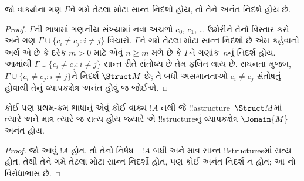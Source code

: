\documentclass[../../../include/open-logic-section]{subfiles}
\begin{document}

\begin{thm}
 જો વાક્યોના ગણ $\Gamma$ને ગમે તેટલા મોટા સાન્ત
નિદર્શો હોય, તો તેને અનંત નિદર્શ હોય છે.
\end{thm}

\begin{proof}
$\Gamma$ની ભાષામાં ગણનીય સંખ્યામાં નવા અચળો $c_0$, $c_1$, \dots
ઉમેરીને તેનો વિસ્તાર કરો અને ગણ $\Gamma \cup \{c_i \neq c_j :
i \neq j\}$ વિચારો. $\Gamma$ને ગમે તેટલા મોટા સાન્ત નિદર્શો છે એમ
કહેવાનો અર્થ એ છે કે દરેક $m >0$ માટે એવું $n\ge m$ મળે છે કે
$\Gamma$ને ગણાંક~$n$નું નિદર્શ હોય. આમાંથી $\Gamma \cup \{c_i \neq
c_j : i \neq j\}$ સાન્ત રીતે સંતોષ્ય છે તેમ ફલિત થાય છે. સઘનતા મુજબ,
$\Gamma \cup \{c_i \neq c_j : i \neq j\}$ને નિદર્શ $\Struct M$ છે;
તે બધી અસમાનતાઓ $c_i \neq c_j$ સંતોષતું હોવાથી તેનું વ્યાપકક્ષેત્ર
અનંત હોવું જ જોઈએ.
\end{proof}

\begin{prop}
કોઈ પણ પ્રથમ-ક્રમ ભાષાનું એવું કોઈ વાક્ય $!A$ નથી જે
!!a{structure}~$\Struct M$માં ત્યારે અને માત્ર ત્યારે જ સત્ય હોય જ્યારે
એ !!{structure}નું વ્યાપકક્ષેત્ર $\Domain{M}$ અનંત હોય.
\end{prop}

\begin{proof}
જો આવું $!A$ હોત, તો તેનો નિષેધ $\lnot !A$ બધી અને માત્ર સાન્ત
!!{structure}sમાં સત્ય હોત. તેથી તેને ગમે તેટલા મોટા સાન્ત નિદર્શો હોત,
પણ કોઈ અનંત નિદર્શ ન હોત; આ નો વિરોધાભાસ છે.
\end{proof}
\end{document}
